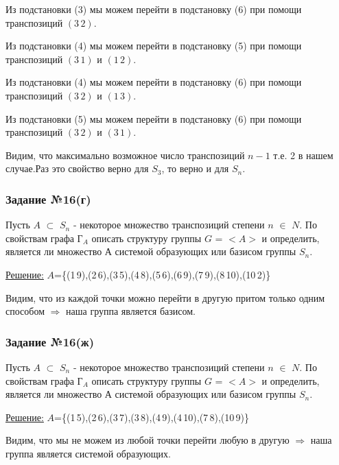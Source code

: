 \documentclass[utf8,14pt,a4paper,oneside,russian]{book}
\begin{document}
	Из подстановки (3) мы можем перейти в подстановку (6) при помощи транспозиций $(3\,2)$.
	
	Из подстановки (4) мы можем перейти в подстановку (5) при помощи транспозиций $(3\,1)$ и $(1\,2)$.
	
	Из подстановки (4) мы можем перейти в подстановку (6) при помощи транспозиций $(3\,2)$ и $(1\,3)$.
	
	Из подстановки (5) мы можем перейти в подстановку (6) при помощи транспозиций $(3\,2)$ и $(3\,1)$.
	
	Видим, что максимально возможное число транспозиций $n-1$ т.е. 2 в нашем случае.Раз это свойство верно для $S_{3}$, то верно и для $S_{n}$.
	
		\subsubsection{Задание №16(г)}
	Пусть $A$ $\subset$ $S_{n}$ - некоторое множество транспозиций степени $n$ $\in$ $N$. По свойствам графа Г$_{A}$ описать структуру группы $G$ = $<A>$ и определить, является ли множество А системой образующих или базисом группы $S_{n}$.
	
	\underline{Решение:} $A$=\{(1\,9),(2\,6),(3\,5),(4\,8),(5\,6),(6\,9),(7\,9),(8\,10),(10\,2)\}
	
	
	Видим, что из каждой точки можно перейти в другую притом только одним способом $\Rightarrow$ наша группа является базисом.
	
	\subsubsection{Задание №16(ж)}
	Пусть $A$ $\subset$ $S_{n}$ - некоторое множество транспозиций степени $n$ $\in$ $N$. По свойствам графа Г$_{A}$ описать структуру группы $G$ = $<A>$ и определить, является ли множество А системой образующих или базисом группы $S_{n}$.
	
	\underline{Решение:} $A$=\{(1\,5),(2\,6),(3\,7),(3\,8),(4\,9),(4\,10),(7\,8),(10\,9)\}
	
	
	Видим, что мы не можем из любой точки перейти любую в другую $\Rightarrow$ наша группа является системой образующих.
	
\end{document}
